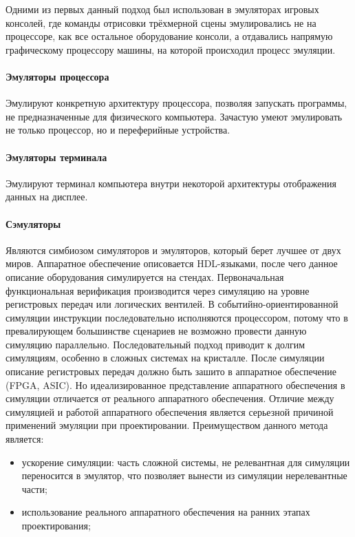 Одними из первых данный подход был использован в эмуляторах игровых консолей, где команды отрисовки трёхмерной сцены
эмулировались не на процессоре, как все остальное оборудование консоли, а отдавались напрямую
графическому процессору машины, на которой происходил процесс эмуляции.


\paragraph{Эмуляторы процессора}\label{cpu-emu}

Эмулируют конкретную архитектуру процессора, позволяя запускать программы, не предназначенные для физического компьютера.
Зачастую умеют эмулировать не только процессор, но и переферийные устройства.


\paragraph{Эмуляторы терминала}\label{term-emu}

Эмулируют терминал компьютера внутри некоторой архитектуры отображения данных на дисплее.


\paragraph{Сэмуляторы}\label{sim-emu}

Являются симбиозом симуляторов и эмуляторов, который берет лучшее от двух миров.
Аппаратное обеспечение описовается HDL-языками, после чего данное описание оборудования симулируется на стендах.
Первоначальная функциональная верификация производится через симуляцию на уровне регистровых передач или логических вентилей.
В событийно-ориентированной симуляции инструкции последовательно исполняются процессором, потому что в превалирующем большинстве
сценариев не возможно провести данную симуляцию параллельно. Последовательный подход приводит к долгим симуляциям, особенно в
сложных системах на кристалле.
После симуляции описание регистровых передач должно быть зашито в аппаратное обеспечение (FPGA, ASIC).
Но идеализированное представление аппаратного обеспечения в симуляции отличается от реального аппаратного обеспечения.
Отличие между симуляцией и работой аппаратного обеспечения является серьезной причиной применений эмуляции при
проектировании.
Преимуществом данного метода является:
\begin{itemize}
    \item ускорение симуляции: часть сложной системы, не релевантная для симуляции переносится в эмулятор,
        что позволяет вынести из симуляции нерелевантные части;
    \item использование реального аппаратного обеспечения на ранних этапах проектирования;
\end{itemize}


